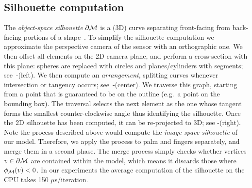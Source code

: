 \subsection*{Silhouette computation}
The \emph{object-space silhouette} $\partial \mathcal{M}$ is a (3D) curve separating front-facing from back-facing portions of a shape~\cite[Sec.1]{olson2006eg}. 
To simplify the silhouette computation we approximate the perspective camera of the sensor with an orthographic one. 
We then offset all elements on the 2D camera plane, and perform a cross-section with this plane: spheres are replaced with circles and planes/cylinders with segments; see~-(left). 
We then compute an \emph{arrangement}, splitting curves whenever intersection or tangency occurs; see~-(center). 
We traverse this graph, starting from a point that is guaranteed to be on the outline (e.g.\ a point on the bounding box). 
The traversal selects the next element as the one whose tangent forms the smallest counter-clockwise angle thus identifying the silhouette. Once the 2D silhouette has been computed, it can be re-projected to 3D; see -(right). 
Note the process described above would compute the \emph{image-space silhouette} of our model. 
Therefore, we apply the process to palm and fingers separately, and merge them in a second phase. 
The merge process simply checks whether vertices $v \in \partial \mathcal{M}$ are contained within the model, which means it discards those where $\phi_{\mathcal{M}}(v)<0$. 
In our experiments the average computation of the silhouette on the CPU takes 150 $\mu$s/iteration.



